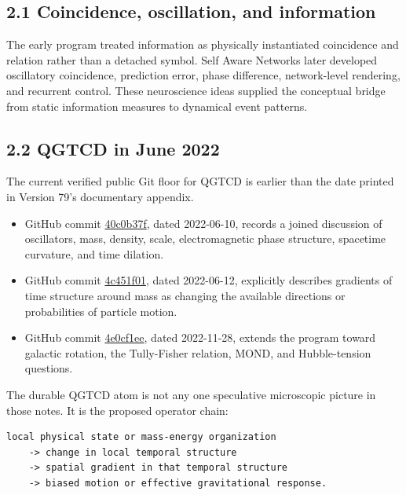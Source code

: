 \documentclass[
  american,
  11pt,
  letterpaper,
]{article}
\providecommand{\tightlist}{%
  \setlength{\itemsep}{0pt}\setlength{\parskip}{0pt}}
\begin{document}
\subsection{2.1 Coincidence, oscillation, and information}\label{coincidence-oscillation-and-information}

The early program treated information as physically instantiated coincidence and relation rather than a detached symbol. Self Aware Networks later developed oscillatory coincidence, prediction error, phase difference, network-level rendering, and recurrent control. These neuroscience ideas supplied the conceptual bridge from static information measures to dynamical event patterns.

\subsection{2.2 QGTCD in June 2022}\label{qgtcd-in-june-2022}

The current verified public Git floor for QGTCD is earlier than the date printed in Version 79's documentary appendix.

\begin{itemize}
\tightlist
\item
  GitHub commit \href{https://github.com/v5ma/selfawarenetworks/commit/40c0b37fc9376a6630ad9d3b09d911997c1c17f4}{40c0b37f}, dated 2022-06-10, records a joined discussion of oscillators, mass, density, scale, electromagnetic phase structure, spacetime curvature, and time dilation.
\item
  GitHub commit \href{https://github.com/v5ma/selfawarenetworks/commit/4c451f016cd076bcb635f4305a55efe54bbf4870}{4c451f01}, dated 2022-06-12, explicitly describes gradients of time structure around mass as changing the available directions or probabilities of particle motion.
\item
  GitHub commit \href{https://github.com/v5ma/selfawarenetworks/commit/4e0cf1ee0975c01dc57182368497d3f0cd864030}{4e0cf1ee}, dated 2022-11-28, extends the program toward galactic rotation, the Tully-Fisher relation, MOND, and Hubble-tension questions.
\end{itemize}

The durable QGTCD atom is not any one speculative microscopic picture in those notes. It is the proposed operator chain:

\begin{verbatim}
local physical state or mass-energy organization
    -> change in local temporal structure
    -> spatial gradient in that temporal structure
    -> biased motion or effective gravitational response.
\end{verbatim}
\end{document}
